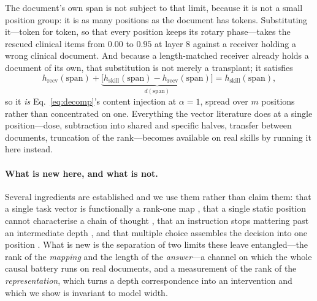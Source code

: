 \documentclass{article}
\newcommand{\dvec}{\ensuremath{d}}
\begin{document}
The document's own span is not subject to that limit, because it is not a small
position group: it is as many positions as the document has tokens.
Substituting it---token for token, so that every position keeps its rotary
phase---takes the rescued clinical items from $0.00$ to $0.95$ at layer $8$
against a receiver holding a wrong clinical document. And because a
length-matched receiver already holds a document of its own, that substitution
is not merely a transplant; it satisfies
\begin{equation}
h_{\text{recv}}(\text{span}) + \underbrace{\bigl[h_{\text{skill}}(\text{span})
- h_{\text{recv}}(\text{span})\bigr]}_{\dvec(\text{span})}
= h_{\text{skill}}(\text{span}),
\end{equation}
so it \emph{is} Eq.~\ref{eq:decomp}'s content injection at $\alpha = 1$, spread
over $m$ positions rather than concentrated on one. Everything the vector
literature does at a single position---dose, subtraction into shared and
specific halves, transfer between documents, truncation of the rank---becomes
available on real skills by running it here instead.

\paragraph{What is new here, and what is not.} Several ingredients are
established and we use them rather than claim them: that a single task vector is
functionally a rank-one map \citep{dong2026taskvectorlimits}, that a single
static position cannot characterise a chain of thought
\citep{dura2026sequentialpatching}, that an instruction stops mattering past an
intermediate depth \citep{onset2025instruction}, and that multiple choice
assembles the decision into one position \citep{wiegreffe2025mcq}. What is new
is the separation of two limits these leave entangled---the rank of the
\emph{mapping} and the length of the \emph{answer}---a channel on which the
whole causal battery runs on real documents, and a measurement of the rank of
the \emph{representation}, which turns a depth correspondence into an
intervention and which we show is invariant to model width.




\begin{table}[h]
\caption{Participation ratio of the document's span on Qwen3-8B, measured four
ways, medians over $36$ items (the plain column is bimodal, so its mean
describes no item). The first column is the quantity usually reported and the
only one that collapses. The last two columns say why: at layer $16$ one token
of each document acquires a state $150$ times the span's median norm, carried by
two fixed hidden dimensions, and the top eight dimensions then hold $98\%$ of
the variance. Removing four positions out of four hundred, or normalising each
position to unit length, removes the collapse entirely.}
\label{tab:prdiag}
\centering
\small
\setlength{\tabcolsep}{4pt}

\end{table}
\end{document}
